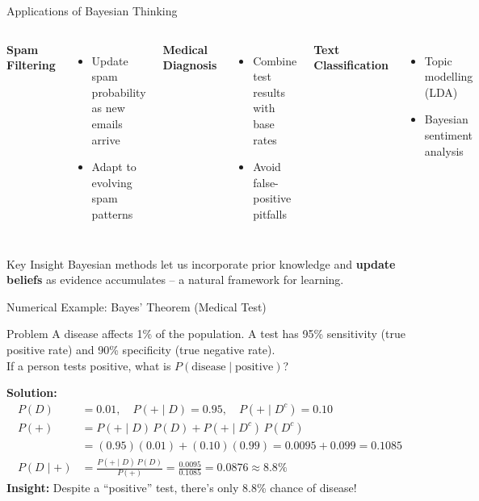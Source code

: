 \begin{frame}{Applications of Bayesian Thinking}
\begin{columns}[T]
\textbf{Spam Filtering}
\begin{itemize}
    \item Update spam probability as new emails arrive
    \item Adapt to evolving spam patterns
\end{itemize}
\textbf{Medical Diagnosis}
\begin{itemize}
    \item Combine test results with base rates
    \item Avoid false-positive pitfalls
\end{itemize}
\textbf{Text Classification}
\begin{itemize}
    \item Topic modelling (LDA)
    \item Bayesian sentiment analysis
\end{itemize}
\end{columns}
\vspace{8pt}
\begin{alertblock}{Key Insight}
Bayesian methods let us incorporate prior knowledge and \textbf{update beliefs} as evidence accumulates -- a natural framework for learning.
\end{alertblock}
\end{frame}

\begin{frame}{Numerical Example: Bayes' Theorem (Medical Test)}
\begin{exampleblock}{Problem}
A disease affects 1\% of the population. A test has 95\% sensitivity (true positive rate) and 90\% specificity (true negative rate).\\
If a person tests positive, what is $P(\text{disease}\mid\text{positive})$?
\end{exampleblock}
\textbf{Solution:}
\begin{align*}
P(D) &= 0.01, \quad P(+\mid D)=0.95, \quad P(+\mid D^c)=0.10\\[4pt]
P(+) &= P(+\mid D)\,P(D) + P(+\mid D^c)\,P(D^c)\\
     &= (0.95)(0.01) + (0.10)(0.99) = 0.0095 + 0.099 = 0.1085\\[4pt]
P(D\mid +) &= \frac{P(+\mid D)\,P(D)}{P(+)} = \frac{0.0095}{0.1085} = \mathbf{0.0876 \approx 8.8\%}
\end{align*}
\textbf{Insight:} Despite a ``positive'' test, there's only 8.8\% chance of disease!
\end{frame}

